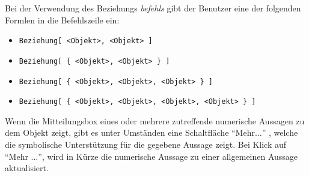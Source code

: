\documentclass{article}
\begin{document}
Bei der Verwendung des Beziehungs \textit{befehls} gibt der Benutzer eine der folgenden Formlen in die Befehlszeile ein:
\begin{itemize}
    \item \texttt{Beziehung[ <Objekt>, <Objekt> ]}
    \item \texttt{Beziehung[ \{ <Objekt>, <Objekt> \} ]}
    \item \texttt{Beziehung[ \{ <Objekt>, <Objekt>, <Objekt> \} ]}
    \item \texttt{Beziehung[ \{ <Objekt>, <Objekt>, <Objekt>, <Objekt> \} ]}
\end{itemize}

Wenn die Mitteilungsbox eines oder mehrere zutreffende numerische Aussagen zu dem Objekt zeigt, gibt es unter Umständen eine Schaltfläche  ``Mehr$\ldots$'' , welche die symbolische Unterstützung für die gegebene Aussage zeigt. Bei Klick auf ``Mehr $\ldots$'', wird in Kürze die numerische Aussage zu einer allgemeinen Aussage aktualisiert.
\end{document}

